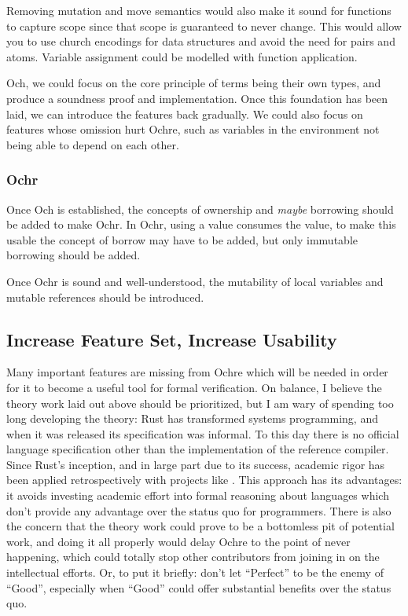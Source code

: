 \documentclass[12pt,twoside]{report}
\begin{document}
Removing mutation and move semantics would also make it sound for functions to capture scope since that scope is guaranteed to never change. This would allow you to use church encodings for data structures and avoid the need for pairs and atoms. Variable assignment could be modelled with function application.

Och, we could focus on the core principle of terms being their own types, and produce a soundness proof and implementation. Once this foundation has been laid, we can introduce the features back gradually. We could also focus on features whose omission hurt Ochre, such as variables in the environment not being able to depend on each other.

\subsubsection{Ochr}
Once Och is established, the concepts of ownership and \textit{maybe} borrowing should be added to make Ochr. In Ochr, using a value consumes the value, to make this usable the concept of borrow may have to be added, but only immutable borrowing should be added.

Once Ochr is sound and well-understood, the mutability of local variables and mutable references should be introduced.

\subsection{Increase Feature Set, Increase Usability}
Many important features are missing from Ochre which will be needed in order for it to become a useful tool for formal verification. On balance, I believe the theory work laid out above should be prioritized, but I am wary of spending too long developing the theory: Rust has transformed systems programming, and when it was released its specification was informal. To this day there is no official language specification other than the implementation of the reference compiler. Since Rust's inception, and in large part due to its success, academic rigor has been applied retrospectively with projects like \cite{jungRustBeltSecuringFoundations2018a}. This approach has its advantages: it avoids investing academic effort into formal reasoning about languages which don't provide any advantage over the status quo for programmers. There is also the concern that the theory work could prove to be a bottomless pit of potential work, and doing it all properly would delay Ochre to the point of never happening, which could totally stop other contributors from joining in on the intellectual efforts. Or, to put it briefly: don't let ``Perfect'' to be the enemy of ``Good'', especially when ``Good'' could offer substantial benefits over the status quo.
\end{document}
